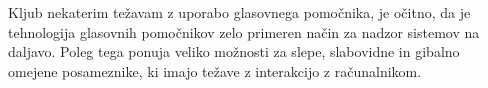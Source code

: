 \documentclass[a4paper, 12pt]{book}
\begin{document}
Kljub nekaterim težavam z uporabo glasovnega pomočnika, je očitno, da je tehnologija glasovnih pomočnikov zelo primeren način za nadzor sistemov na daljavo.
Poleg tega ponuja veliko možnosti za slepe, slabovidne in gibalno omejene posameznike, ki imajo težave z interakcijo z računalnikom.




\newpage %
\ \\
\clearpage
{}

\printbibliography
\end{document}
